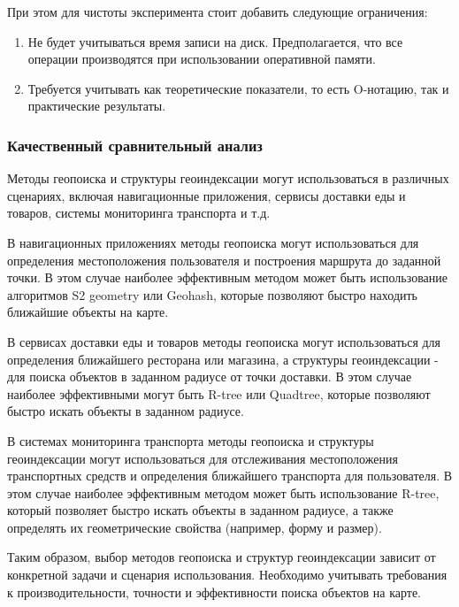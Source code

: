 При этом для чистоты эксперимента стоит добавить следующие ограничения:
\begin{enumerate}
    \item Не будет учитываться время записи на диск. Предполагается, что все операции производятся при использовании оперативной памяти.
    \item Требуется учитывать как теоретические показатели, то есть O-нотацию, так и практические результаты.
\end{enumerate}

\subsubsection{Качественный сравнительный анализ}
Методы геопоиска и структуры геоиндексации могут использоваться в различных сценариях, включая навигационные приложения, сервисы доставки еды и товаров, системы мониторинга транспорта и т.д.

В навигационных приложениях методы геопоиска могут использоваться для определения местоположения пользователя и построения маршрута до заданной точки. В этом случае наиболее эффективным методом может быть использование алгоритмов S2 geometry или Geohash, которые позволяют быстро находить ближайшие объекты на карте.

В сервисах доставки еды и товаров методы геопоиска могут использоваться для определения ближайшего ресторана или магазина, а структуры геоиндексации - для поиска объектов в заданном радиусе от точки доставки. В этом случае наиболее эффективными могут быть R-tree или Quadtree, которые позволяют быстро искать объекты в заданном радиусе.

В системах мониторинга транспорта методы геопоиска и структуры геоиндексации могут использоваться для отслеживания местоположения транспортных средств и определения ближайшего транспорта для пользователя. В этом случае наиболее эффективным методом может быть использование R-tree, который позволяет быстро искать объекты в заданном радиусе, а также определять их геометрические свойства (например, форму и размер).

Таким образом, выбор методов геопоиска и структур геоиндексации зависит от конкретной задачи и сценария использования. Необходимо учитывать требования к производительности, точности и эффективности поиска объектов на карте.


